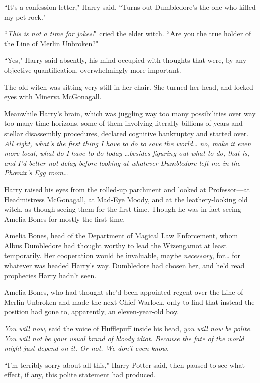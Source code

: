 ``It's a confession letter," Harry said. ``Turns out Dumbledore's the one who killed my pet rock."

``\emph{This is not a time for jokes!}" cried the elder witch. ``Are you the true holder of the Line of Merlin Unbroken?"

``Yes," Harry said absently, his mind occupied with thoughts that were, by any objective quantification, overwhelmingly more important.

The old witch was sitting very still in her chair. She turned her head, and locked eyes with Minerva McGonagall.

Meanwhile Harry's brain, which was juggling way too many possibilities over way too many time horizons, some of them involving literally billions of years and stellar disassembly procedures, declared cognitive bankruptcy and started over. \emph{All right, what's the \emph{first} thing I have to do to save the world{\ldots} no, make it even more local, what do I have to do \emph{today} {\ldots}besides figuring out what to do, that is, and I'd better not delay before looking at whatever Dumbledore left me in the Phœnix's Egg room{\ldots}}

Harry raised his eyes from the rolled-up parchment and looked at Professor—at Headmistress McGonagall, at Mad-Eye Moody, and at the leathery-looking old witch, as though seeing them for the first time. Though he was in fact seeing Amelia Bones for mostly the first time.

Amelia Bones, head of the Department of Magical Law Enforcement, whom Albus Dumbledore had thought worthy to lead the Wizengamot at least temporarily. Her cooperation would be invaluable, maybe \emph{necessary}, for{\ldots} for whatever was headed Harry's way. Dumbledore had chosen her, and he'd read prophecies Harry hadn't seen.

Amelia Bones, who had thought she'd been appointed regent over the Line of Merlin Unbroken and made the next Chief Warlock, only to find that instead the position had gone to, apparently, an eleven-year-old boy.

\emph{You will now,} said the voice of Hufflepuff inside his head, \emph{you will now be polite. You will not be your usual brand of bloody idiot. Because the fate of the world might just depend on it. Or not. We don't even know.}

``I'm terribly sorry about all this," Harry Potter said, then paused to see what effect, if any, this polite statement had produced.

